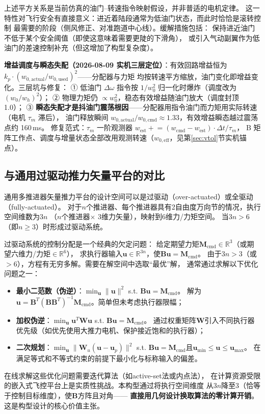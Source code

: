 上述平方关系是当前仿真的油门--转速指令映射假设，并非普适的电机定律。
这一特性对飞行安全有直接意义：进近着陆段通常为低油门状态，而此时恰恰是滚转控制
最需要的阶段（侧风修正、对准跑道中心线）。缓解措施包括：
保持进近油门不低于某个安全阈值（即使这意味着需要更陡的下滑角），
或引入气动副翼作为低油门的差速控制补充（但这增加了构型复杂度）。

\textbf{增益调度与瞬态失配（2026-08-09 实机三层定位）}：有效回路增益恒为
$k_p\cdot\left(w_{0,\text{actual}}/w_{0,\text{used}}\right)^2$——分配器与力矩
均按转速平方缩放，油门变化即增益变化。三层坑与修复：
① 低油门 $\Delta\omega$ 指令按 $1/w_0^2$ 归一化时爆炸（调度改为 $(w_0/w_h)^2$）；
② 物理力矩仍 $\propto w_0^2$，稳态有效增益随油门放大（调度封顶 1.0）；
③ \textbf{瞬态失配才是抖油门震荡根因}——分配器用指令油门而力矩用实际转速（电机 $\tau_m$ 滞后），
油门释放瞬间 $w_{0,\text{actual}}/w_{0,\text{cmd}}\approx1.33$，有效增益瞬态越过震荡点约 160\,ms。
修复范式：$\tau_m$ 一阶观测器 $w_{\text{est}} \mathrel{+}= (w_{\text{cmd}}-w_{\text{est}})\cdot\Delta t/\tau_m$，
B 矩阵工作点、调度与增量状态全部改用观测转速（$w_{0,\text{eff}}$，见第\ref{sec:vtol}节实机锚点）。
\subsection{与通用过驱动推力矢量平台的对比}

通用多推进器矢量推力平台的设计空间可以是过驱动（over-actuated）或全驱动（fully-actuated）。
对于$n$个推进器、每个推进器具有2自由度万向节的情况，执行空间维数为$3n$
（$n$个推进器$\times$ 3维力矢量），映射到6维力/力矩空间。
当$3n > 6$（即$n \ge 3$）时形成过驱动系统\cite{ding2018modeling}。

过驱动系统的控制分配是一个经典的欠定问题：
给定期望力矩$\bm{M}_{\text{cmd}} \in \mathbb{R}^3$（或期望六维力/力矩$\in \mathbb{R}^6$），
求执行器输入$\bm{u} \in \mathbb{R}^{3n}$，使$\bm{B}\bm{u} = \bm{M}_{\text{cmd}}$。
由于$3n > 3$（或$>6$），方程有无穷多解。需要在解空间中选取“最优”解，
通常通过求解以下优化问题之一\cite{johansen2013control}：
\begin{itemize}
    \item \textbf{最小二范数（伪逆）}：$\min_{\bm{u}} \|\bm{u}\|^2$ s.t. $\bm{B}\bm{u} = \bm{M}_{\text{cmd}}$。
          解为$\bm{u} = \bm{B}^T(\bm{B}\bm{B}^T)^{-1}\bm{M}_{\text{cmd}}$。简单但未考虑执行器限幅；
    \item \textbf{加权伪逆}：$\min_{\bm{u}} \bm{u}^T\bm{W}\bm{u}$ s.t. $\bm{B}\bm{u} = \bm{M}_{\text{cmd}}$。
          通过权重矩阵$\bm{W}$引入不同执行器优先级（如优先使用大推力电机、保护接近饱和的执行器）；
    \item \textbf{二次规划}：$\min_{\bm{u}} \|\bm{W}_u(\bm{u} - \bm{u}_p)\|^2$ s.t.
          $\bm{B}\bm{u} = \bm{M}_{\text{cmd}}$且$\bm{u}_{\min} \le \bm{u} \le \bm{u}_{\max}$。
          在满足等式和不等式约束的前提下最小化与标称输入的偏差。
\end{itemize}

\sloppy
在线求解这些优化问题需要迭代算法（如active-set法或内点法），
在计算资源受限的嵌入式飞控平台上是实质性挑战。本构型通过将执行空间维度
从$3n$降至$3$（恰等于控制目标维度），使$\bm{B}$方阵且对角——
\textbf{直接用几何设计换取算法的零计算开销}。这是构型设计的核心价值主张。
\fussy
